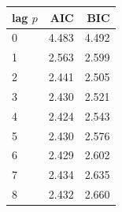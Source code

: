 \begin{tabular}{|l|r|r|}
\hline
\textbf{lag $p$} & \textbf{AIC} & \textbf{BIC} \\\hline
0 & 4.483 & 4.492 \\\hline
1 & 2.563 & 2.599 \\\hline
2 & 2.441 & 2.505 \\\hline
3 & 2.430 & 2.521 \\\hline
4 & 2.424 & 2.543 \\\hline
5 & 2.430 & 2.576 \\\hline
6 & 2.429 & 2.602 \\\hline
7 & 2.434 & 2.635 \\\hline
8 & 2.432 & 2.660 \\\hline
\end{tabular}
